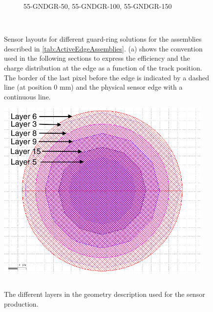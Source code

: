 \begin{figure}[htbp]
\begin{subfigure}[t]{0.5\textwidth}
\begin{tikzpicture}
    \end{tikzpicture}
    \caption{55-GNDGR-50, 55-GNDGR-100, 55-GNDGR-150}
    \label{fig:Layout50_GNDGR}
  \end{subfigure}~
  \caption{Sensor layouts for different guard-ring solutions for the
    assemblies described in \cref{tab:ActiveEdgeAssemblies}. (a) shows
    the convention used in the following sections to express the
    efficiency and the charge distribution at the edge as a function
    of the track position. The border of the last pixel before the
    edge is indicated by a dashed line (at position 0 mm) and the
    physical sensor edge with a continuous line.}
  \label{fig:Layout_guard_ring}
\end{figure}


\begin{figure}[htbp]
  \centering
  \begin{minipage}[t]{.4\textwidth}
    \centering
    \vspace{0pt}
    \includegraphics[width=0.95\textwidth]{figures/ActiveEdge/pixelLayout_withLayers.png}
    \caption{The different layers in the geometry description used for
      the sensor production.}
    \label{fig:PixelLayout}
  \end{minipage}
  \hfill
  \begin{minipage}[t]{.56\textwidth}
    \centering
    \vspace{0pt}
    \label{tab:PixelStackDimensions}
    \begin{tabular}{l l}

\end{tabular}
\end{minipage}
\end{figure}
